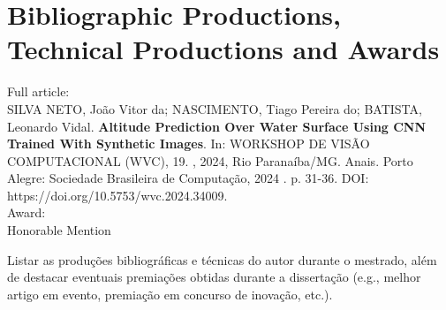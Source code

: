 \chapter*{Bibliographic Productions, Technical Productions and Awards} 

Full article: \\
SILVA NETO, João Vitor da; NASCIMENTO, Tiago Pereira do; BATISTA, Leonardo Vidal. \textbf{Altitude Prediction Over Water Surface Using CNN Trained With Synthetic Images}. In: WORKSHOP DE VISÃO COMPUTACIONAL (WVC), 19. , 2024, Rio Paranaíba/MG. Anais. Porto Alegre: Sociedade Brasileira de Computação, 2024 . p. 31-36. DOI: https://doi.org/10.5753/wvc.2024.34009. 
\\
Award: \\
Honorable Mention

Listar as produções bibliográficas e técnicas do autor durante o mestrado, além de destacar eventuais premiações obtidas durante a dissertação (e.g., melhor artigo em evento, premiação em concurso de inovação, etc.).
